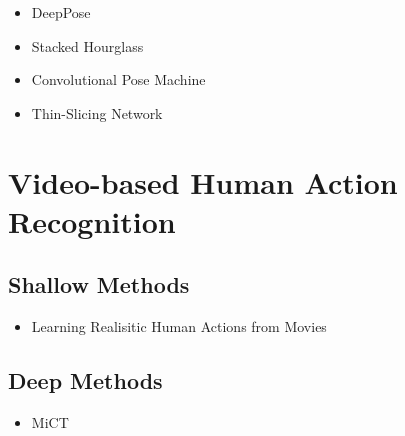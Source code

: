 \begin{itemize}
    \item DeepPose \cite{toshev_deeppose:_2014}
    \item Stacked Hourglass \cite{newell_stacked_2016}
    \item Convolutional Pose Machine \cite{wei_convolutional_2016}
    \item Thin-Slicing Network \cite{song_thin-slicing_2017}
\end{itemize}

\section{Video-based Human Action Recognition}
\subsection{Shallow Methods}
\begin{itemize}
    \item Learning Realisitic Human Actions from Movies \cite{laptev_learning_2008}
\end{itemize}

\subsection{Deep Methods}
\begin{itemize}
    \item MiCT \cite{zhou_mict:_2018}
\end{itemize}